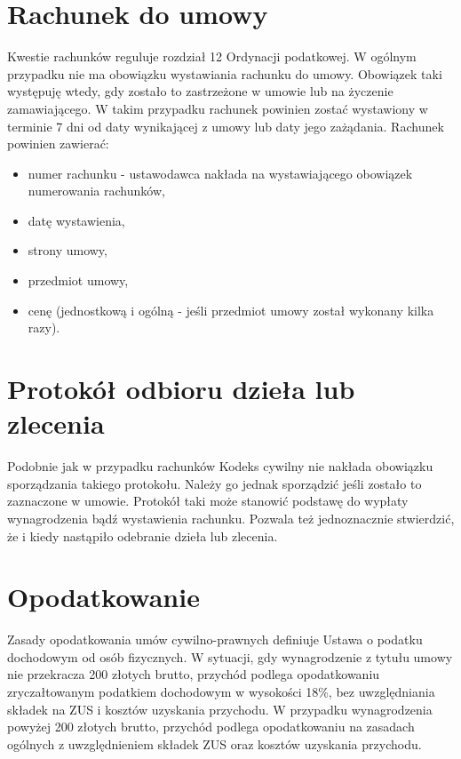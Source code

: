\section[Rachunek do umowy][Rachunek do umowy]{Rachunek do umowy}
Kwestie rachunków reguluje rozdział 12 Ordynacji podatkowej\cite{ordynacjaPodatkowa}. W ogólnym przypadku nie ma obowiązku wystawiania rachunku do umowy. Obowiązek taki występuję wtedy, gdy zostało to zastrzeżone w umowie lub na życzenie zamawiającego. W takim przypadku rachunek powinien zostać wystawiony w terminie 7 dni od daty wynikającej z umowy lub daty jego zażądania. Rachunek powinien zawierać:
\begin{itemize}
\item numer rachunku - ustawodawca nakłada na wystawiającego obowiązek numerowania rachunków,
\item datę wystawienia,
\item strony umowy,
\item przedmiot umowy,
\item cenę (jednostkową i ogólną - jeśli przedmiot umowy został wykonany kilka razy).
\end{itemize}

\section[Protokół odbioru dzieła lub zlecenia][Protokół odbioru dzieła lub zlecenia]{Protokół odbioru dzieła lub zlecenia}
Podobnie jak w przypadku rachunków Kodeks cywilny nie nakłada obowiązku sporządzania takiego protokołu. Należy go jednak sporządzić jeśli zostało to zaznaczone w umowie. Protokół taki może stanowić podstawę do wypłaty wynagrodzenia bądź wystawienia rachunku. Pozwala też jednoznacznie stwierdzić, że i kiedy nastąpiło odebranie dzieła lub zlecenia.

\section[Opodatkowanie][Opodatkowanie]{Opodatkowanie}
Zasady opodatkowania umów cywilno-prawnych definiuje Ustawa o podatku dochodowym od osób fizycznych\cite{ustawaOPodatkuDochodowym}. W sytuacji, gdy wynagrodzenie z tytułu umowy nie przekracza 200 złotych brutto, przychód podlega opodatkowaniu zryczałtowanym podatkiem dochodowym w wysokości 18\%, bez uwzględniania składek na ZUS i kosztów uzyskania przychodu.
W przypadku wynagrodzenia powyżej 200 złotych brutto, przychód podlega opodatkowaniu na zasadach ogólnych z uwzględnieniem składek ZUS oraz kosztów uzyskania przychodu.


